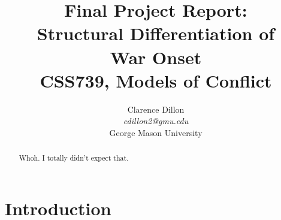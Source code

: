 \documentclass[pdftex,12pt]{article}
\begin{document}
 


\pagestyle{plain}
  \fancyhf{}
  \fancyhead[L]{\small \today}
  \fancyfoot[C]{-- \thepage\ --}

  \author{Clarence Dillon\\
  \emph{cdillon2@gmu.edu}\\
  George Mason University}  
  
\title{Final Project Report:\\ Structural Differentiation of\\ War Onset \\ CSS739, Models of Conflict}

\maketitle

\begin{abstract}
Whoh. I totally didn't expect that. 

\end{abstract}

\thispagestyle{empty}
\newpage


\doublespace

\section{Introduction}

%
%
%
%
\end{document}
